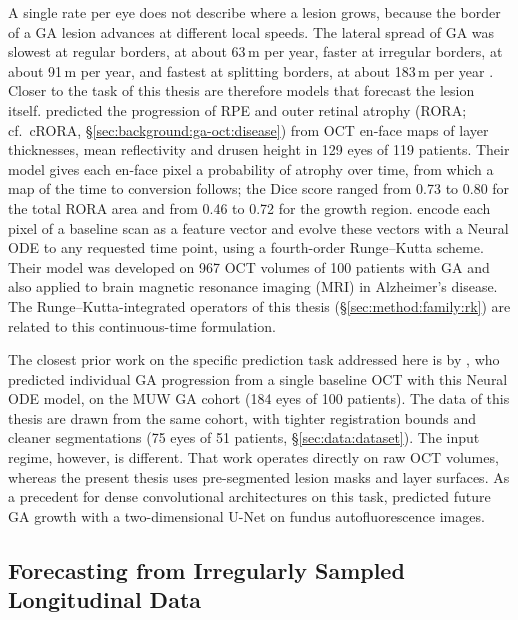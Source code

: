 A single rate per eye does not describe where a lesion grows, because
the border of a GA lesion advances at different local speeds. The lateral
spread of GA was slowest at regular borders, at about 63\,\textmu{}m per
year, faster at irregular borders, at about 91\,\textmu{}m per year, and
fastest at splitting borders, at about 183\,\textmu{}m per year
\citep{Lindner2018}. Closer to the task of this thesis are therefore
models that forecast the lesion itself. \citet{Gigon2021} predicted the progression of RPE and outer retinal
atrophy (RORA; cf.\ cRORA, \S\ref{sec:background:ga-oct:disease}) from OCT
en-face maps of layer thicknesses, mean reflectivity and drusen height in
129 eyes of 119 patients. Their model gives each en-face pixel a
probability of atrophy over time, from which a map of the time to
conversion follows; the Dice score ranged from 0.73 to 0.80 for the total
RORA area and from 0.46 to 0.72 for the growth region.
\citet{Lachinov2024} encode each pixel of a baseline scan as a feature
vector and evolve these vectors with a Neural ODE \citep{Chen2018} to any
requested time point, using a fourth-order Runge--Kutta scheme. Their
model was developed on 967 OCT volumes of 100 patients with GA and also
applied to brain magnetic resonance imaging (MRI) in Alzheimer's disease. The Runge--Kutta-integrated
operators of this thesis (\S\ref{sec:method:family:rk}) are related to
this continuous-time formulation.

The closest prior work on the specific prediction task addressed here
is by \citet{Mai2024}, who predicted individual GA progression from a
single baseline OCT with this Neural ODE model, on the MUW GA cohort
(184 eyes of 100 patients). The
data of this thesis are drawn from the same cohort, with tighter
registration bounds and cleaner segmentations (75 eyes of 51 patients,
\S\ref{sec:data:dataset}). The input regime, however, is different. That
work operates directly on raw OCT volumes, whereas the present thesis
uses pre-segmented lesion masks and layer surfaces.
As a precedent for dense convolutional architectures on this task,
\citet{Salvi2025} predicted future GA growth with a two-dimensional
U-Net on fundus autofluorescence images.

\subsection{Forecasting from Irregularly Sampled Longitudinal Data}
\label{sec:background:related-work:irregular}

